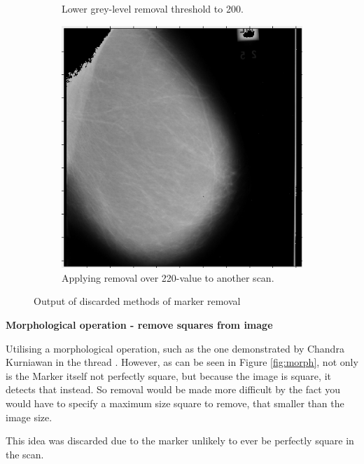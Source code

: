 \begin{figure}[H]
\begin{subfigure}[t]{0.3\textwidth}
      \caption{Lower grey-level removal threshold to 200.}
      \label{fig:remove-white-200}
    \end{subfigure} \hfill
    \begin{subfigure}[t]{0.3\textwidth}
      \includegraphics[width=\textwidth]{Chapter2/technical-img/other-scan.png}
      \caption{Applying removal over 220-value to another scan.}
      \label{fig:remove-other-scan}
    \end{subfigure}
    \caption{Output of discarded methods of marker removal}
    \label{fig:marker-removal-discards}
\end{figure}

\noindent \textbf{Morphological operation - remove squares from image}

Utilising a morphological operation, such as the one demonstrated by Chandra Kurniawan in the thread \cite{detect_square}. However, as can be seen in Figure \ref{fig:morph}, not only is the Marker itself not perfectly square, but because the image is square, it detects that instead. So removal would be made more difficult by the fact you would have to specify a maximum size square to remove, that smaller than the image size.

This idea was discarded due to the marker unlikely to ever be perfectly square in the scan.

